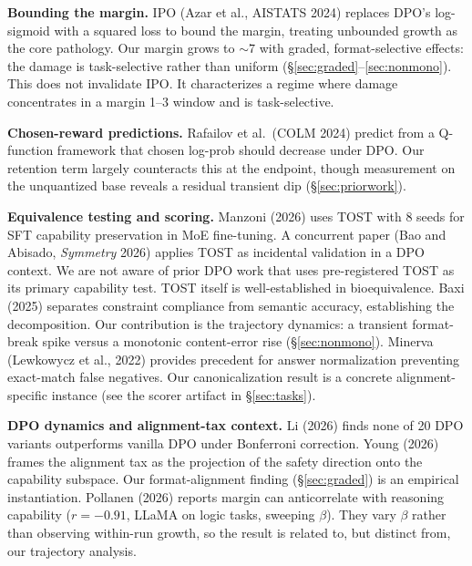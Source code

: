 \documentclass{article}
\begin{document}
\textbf{Bounding the margin.} IPO (Azar et al., AISTATS 2024) \cite{azar2024ipo} replaces DPO's log-sigmoid with a squared loss to bound the margin, treating unbounded growth as the core pathology. Our margin grows to ${\sim}7$ with graded, format-selective effects: the damage is task-selective rather than uniform (\S\ref{sec:graded}--\ref{sec:nonmono}). This does not invalidate IPO. It characterizes a regime where damage concentrates in a margin 1--3 window and is task-selective.

\textbf{Chosen-reward predictions.} Rafailov et al.\ (COLM 2024) \cite{rafailov2024qfunction} predict from a Q-function framework that chosen log-prob should decrease under DPO. Our retention term largely counteracts this at the endpoint, though measurement on the unquantized base reveals a residual transient dip (\S\ref{sec:priorwork}).

\textbf{Equivalence testing and scoring.} Manzoni (2026) \cite{manzoni2026tost} uses TOST with 8 seeds for SFT capability preservation in MoE fine-tuning. A concurrent paper (Bao and Abisado, \emph{Symmetry} 2026) \cite{bao2026pareto} applies TOST as incidental validation in a DPO context. We are not aware of prior DPO work that uses pre-registered TOST as its primary capability test. TOST itself is well-established in bioequivalence. Baxi (2025) \cite{baxi2025scoring} separates constraint compliance from semantic accuracy, establishing the decomposition. Our contribution is the trajectory dynamics: a transient format-break spike versus a monotonic content-error rise (\S\ref{sec:nonmono}). Minerva (Lewkowycz et al., 2022) \cite{lewkowycz2022minerva} provides precedent for answer normalization preventing exact-match false negatives. Our canonicalization result is a concrete alignment-specific instance (see the scorer artifact in \S\ref{sec:tasks}).

\textbf{DPO dynamics and alignment-tax context.} Li (2026) \cite{li2026oxrl} finds none of 20 DPO variants outperforms vanilla DPO under Bonferroni correction. Young (2026) \cite{young2026geometry} frames the alignment tax as the projection of the safety direction onto the capability subspace. Our format-alignment finding (\S\ref{sec:graded}) is an empirical instantiation. Pollanen (2026) \cite{pollanen2026margin} reports margin can anticorrelate with reasoning capability ($r = -0.91$, LLaMA on logic tasks, sweeping $\beta$). They vary $\beta$ rather than observing within-run growth, so the result is related to, but distinct from, our trajectory analysis.
\end{document}
